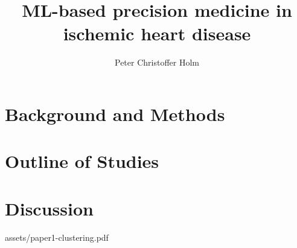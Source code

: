 \documentclass[a4paper, twoside, nobib]{tufte-book}
\title{ML-based precision medicine in ischemic heart disease}
\author[Peter Christoffer Holm]{Peter Christoffer Holm}
\begin{document}
\frontmatter
\maketitle


\cleardoublepage
\tableofcontents
\listoffigures
\listoftables


\cleardoublepage

\mainmatter %

\part{Background and Methods}


\part{Outline of Studies}

\part{Discussion}
% 


\backmatter %

\printbibliography

\mainmatter %

\appendix
\appendixpage
\addappheadtotoc
\cleardoublepage

%
    {assets/paper1-clustering.pdf}
\end{document}
